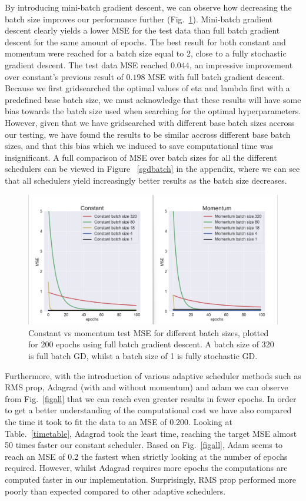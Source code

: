 \documentclass[onecolumn,10pt,cleanfoot]{asme2ej}
\begin{document}
By introducing mini-batch gradient descent, we can observe how decreasing the batch size improves our performance further (Fig.~\ref{batch_constant_v_momentum}). Mini-batch gradient descent clearly yields a lower MSE for the test data than full batch gradient descent for the same amount of epochs. The best result for both constant and momentum were reached for a batch size equal to 2, close to a fully stochastic gradient descent. The test data MSE reached $0.044$, an impressive improvement over constant's previous result of $0.198$ MSE with full batch gradient descent. Because we first gridsearched the optimal values of eta and lambda first with a predefined base batch size, we must acknowledge that these results will have some bias towards the batch size used when searching for the optimal hyperparameters. However, given that we have gridsearched with different base batch sizes accross our testing, we have found the results to be similar accross different base batch sizes, and that this bias which we induced to save computational time was insignificant. A full comparison of MSE over batch sizes for all the different schedulers can be viewed in Figure ~\ref{sgdbatch} in the appendix, where we can see that all schedulers yield increasingly better results as the batch size decreases.

\begin{figure}[H]
\centerline{\includegraphics[width=6in]{figure/new_SGD_batch_momentum_constant.png}}
\caption{Constant vs momentum test MSE for different batch sizes, plotted for 200 epochs using full batch gradient descent. A batch size of 320 is full batch GD, whilst a batch size of 1 is fully stochastic GD.}
\label{batch_constant_v_momentum}
\end{figure}

Furthermore, with the introduction of various adaptive scheduler methods such as RMS prop, Adagrad (with and without momentum) and adam we can observe from Fig.~\ref{figall} that we can reach even greater results in fewer epochs. In order to get a better understanding of the computational cost we have also compared the time it took to fit the data to an MSE of 0.200. Looking at Table.~\ref{timetable}, Adagrad took the least time, reaching the target MSE almost 50 times faster our constant scheduler. Based on Fig.~\ref{figall}, Adam seems to reach an MSE of 0.2 the fastest when strictly looking at the number of epochs required. However, whilst Adagrad requires more epochs the computations are computed faster in our implementation. Surprisingly, RMS prop performed more poorly than expected compared to other adaptive schedulers.
\end{document}
